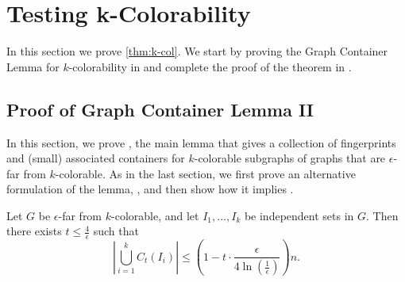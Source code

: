 \documentclass[11pt]{article}
\begin{document}
\section{Testing k-Colorability}
\label{sect:colorable}
In this section we prove \autoref{thm:k-col}. 
We start by proving the Graph Container Lemma for $k$-colorability in  and complete the proof of the theorem in .


\subsection{Proof of Graph Container Lemma II}
\label{sect:col-GCL}
In this section, we prove , the main lemma that gives a collection of fingerprints and (small) associated containers for $k$-colorable subgraphs of graphs that are $\epsilon$-far from $k$-colorable.
As in the last section, we first prove an alternative formulation of the lemma, , and then show how it implies .

\begin{lemma}
\label{lem:GCL-kcol}
Let $G$ be $\epsilon$-far from $k$-colorable, and let $I_1,\dots,I_k$ be independent sets in $G.$ Then there exists $t \le \frac4\epsilon$ such that
\begin{equation}
\label{eq:GCL-kcol}
\left|\bigcup_{i=1}^k C_t(I_i)\right| \leq \left( 1 - t \cdot \frac{\epsilon}{4\ln (\frac 1\epsilon)} \right)n. 
\end{equation}
\end{lemma}
\end{document}
